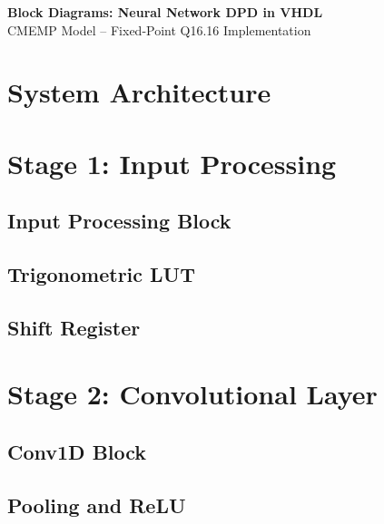 \documentclass[a4paper,12pt]{article}
\begin{document}
\begin{center}
    {\LARGE\sffamily\bfseries Block Diagrams: Neural Network DPD in VHDL}\\[3mm]
    {\large\sffamily CMEMP Model -- Fixed-Point Q16.16 Implementation}
\end{center}

\vspace{5mm}

\section{System Architecture}


\section{Stage 1: Input Processing}


\subsection{Input Processing Block}


\subsection{Trigonometric LUT}


\subsection{Shift Register}


\section{Stage 2: Convolutional Layer}


\subsection{Conv1D Block}


\subsection{Pooling and ReLU}

\end{document}
